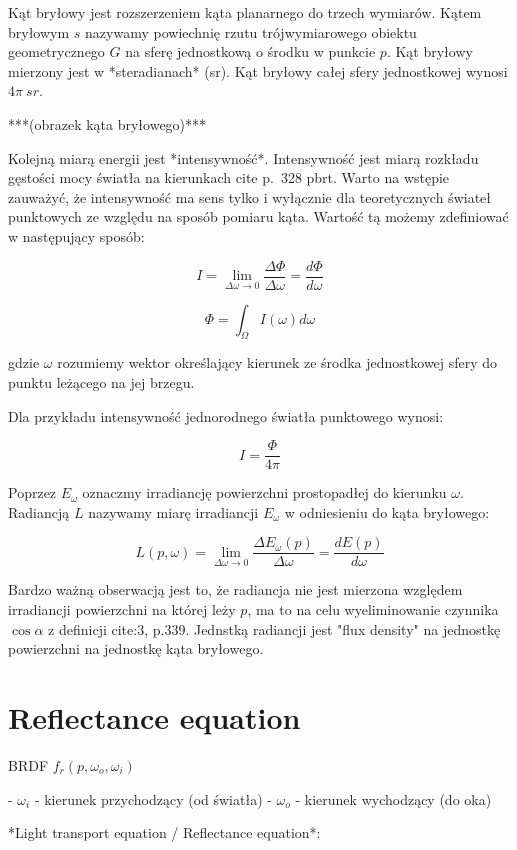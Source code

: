 \documentclass[../main.tex]{subfiles}
\begin{document}
Kąt bryłowy jest rozszerzeniem kąta planarnego do trzech wymiarów. Kątem
bryłowym $s$ nazywamy powiechnię rzutu trójwymiarowego obiektu geometrycznego
$G$ na sferę jednostkową o środku w punkcie $p$. Kąt bryłowy mierzony jest
w *steradianach* (sr). Kąt bryłowy całej sfery jednostkowej wynosi
  $4\pi \:{sr}$.

***(obrazek kąta bryłowego)***

Kolejną miarą energii jest *intensywność*. Intensywność jest miarą rozkładu
gęstości mocy światła na kierunkach cite p.~328 pbrt. Warto na wstępie
zauważyć, że intensywność ma sens tylko i wyłącznie dla teoretycznych świateł
punktowych ze względu na sposób pomiaru kąta. Wartość tą możemy zdefiniować w
następujący sposób:

$$
I = \lim_{\Delta\omega \rightarrow 0} {
    \frac{\Delta\Phi}{\Delta\omega}
} = \frac{d\Phi}{d\omega}
$$

$$
\Phi = \int_{\Omega} {I(\omega) d\omega}
$$

gdzie $\omega$ rozumiemy wektor określający kierunek ze środka jednostkowej
sfery do punktu leżącego na jej brzegu.

Dla przykładu intensywność jednorodnego światła punktowego wynosi:

$$
I = \frac{\Phi}{4\pi}
$$

Poprzez $E_{\omega}$ oznaczmy irradiancję powierzchni prostopadłej do kierunku
$\omega$. Radiancją $L$ nazywamy miarę irradiancji $E_{\omega}$ w odniesieniu
do kąta bryłowego:

$$
L(p, \omega) = \lim_{\Delta\omega \rightarrow 0} {
  \frac{\Delta E_{\omega} (p)}{\Delta\omega}
} =
\frac{d E(p)}{d \omega}
$$

Bardzo ważną obserwacją jest to, że radiancja nie jest mierzona względem
irradiancji powierzchni na której leży $p$, ma to na celu wyeliminowanie
czynnika $\cos \alpha$ z definicji cite:3, p.339. Jednstką radiancji jest "flux
density" na jednostkę powierzchni na jednostkę kąta bryłowego.

\section{Reflectance equation}

BRDF $f_r(p, \omega_o, \omega_i)$

- $\omega_i$ - kierunek przychodzący (od światła)
- $\omega_o$ - kierunek wychodzący (do oka)

*Light transport equation / Reflectance equation*:
\end{document}
